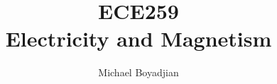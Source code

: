 \documentclass[11pt]{article}
\begin{document}
\title{ECE259 \\ Electricity and Magnetism}
\author{Michael Boyadjian}
\maketitle
\pagebreak

\tableofcontents

\pagebreak

\bigskip
\bigskip
\bigskip
\end{document}
